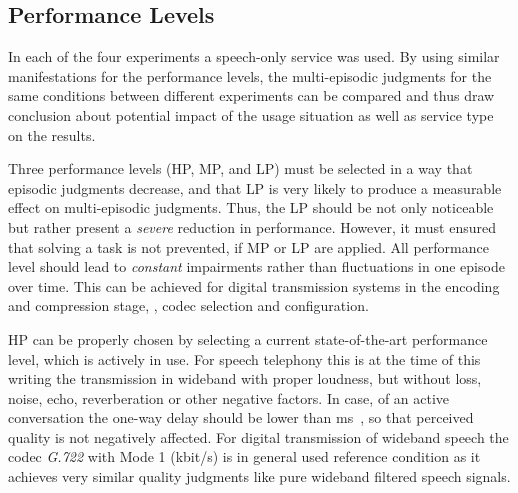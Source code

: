 
\subsection{Performance Levels}
In each of the four experiments a speech-only service was used.
By using similar manifestations for the performance levels, the multi-episodic judgments for the same conditions between different experiments can be compared and thus draw conclusion about potential impact of the usage situation as well as service type on the results.

Three performance levels (\ac{HP}, \ac{MP}, and \ac{LP}) must be selected in a way that episodic judgments decrease, and that \ac{LP} is very likely to produce a measurable effect on multi-episodic judgments.
Thus, the \ac{LP} should be not only noticeable but rather present a \emph{severe} reduction in performance. 
However, it must ensured that solving a task is not prevented, if \ac{MP} or \ac{LP} are applied.
All performance level should lead to \emph{constant} impairments rather than fluctuations in one episode over time.
This can be achieved for digital transmission systems in the encoding and compression stage, \eg, codec selection and configuration.

\ac{HP} can be properly chosen by selecting a current state-of-the-art performance level, which is actively in use.
For speech telephony this is at the time of this writing the transmission in wideband with proper loudness, but without loss, noise, echo, reverberation or other negative factors.
In case, of an active conversation the one-way delay should be lower than \unit[100]{ms}~\citep[\cf,][p. 9]{itu-t_g.107:_2005}, so that perceived quality is not negatively affected.
For digital transmission of wideband speech the codec \emph{G.722} with Mode 1 (\unit[64]{kbit/s}) is in general used reference condition as it achieves very similar quality judgments like pure wideband filtered speech signals. %



